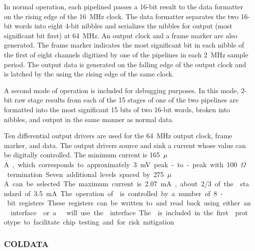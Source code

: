 In normal operation, each pipelined  passes a \num{16}-bit result to the
data formatter on the rising edge of the \SI{16}{MHz} clock.  The data formatter
separates the two \num{16}-bit words into eight \num{4}-bit nibbles and serializes the
nibbles for output (most significant bit first) at \SI{64}{MHz}.  
 An output
clock and a frame marker are also generated.  The frame marker indicates the most
significant bit in each nibble of the first of eight channels digitized by one
of the  pipelines in each \SI{2}{MHz} sample period.  The output data
is generated on the falling edge of the output clock and is latched by the
  using the rising edge of the same clock.  

A second
mode of operation is included for debugging purposes.  In this mode, \num{2}-bit raw
stage results from each of the \num{15} stages of one of the two pipelines are formatted
into the most significant \num{15} bits of two \num{16}-bit words, broken into nibbles, and
output in the same manner as normal data.

Ten differential output drivers are used for the \SI{64}{MHz} output clock, frame
marker, and  data.  The output drivers source and sink a current whose
value can be digitally controlled.  The minimum current is \SI{165}{$\mu$A},
which corresponds to approximately \SI{3}{mV} peak-to-peak with \SI{100}{$\Omega$}
termination.  Seven additional levels spaced by \SI{275}{$\mu$A} can be selected.
The maximum current is \SI{2.07}{mA}, about \num{2/3} of the  standard of
\SI{3.5}{mA}.

The operation of  is controlled by a number of \num{8}-bit registers.
These registers can be written to and read back using either an 
interface~\cite{bib:I2C} or a .  will use the  interface.  The
 is included in the first  prototype to facilitate chip testing
and for risk mitigation.


\subsubsection{COLDATA }
\label{sec:fdsp-tpcelec-design-femb-coldata}

